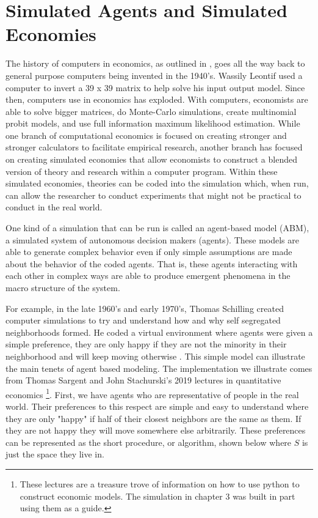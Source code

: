 \documentclass[12pt,twoside]{reedthesis}
\begin{document}
\section{Simulated Agents and Simulated Economies}
The history of computers in economics, as outlined in \citet{Backhouse2016}, goes all the way back to general purpose computers being invented in the 1940's. Wassily Leontif used a computer to invert a 39 x 39 matrix to help solve his input output model. Since then, computers use in economics has exploded. With computers, economists are able to solve bigger matrices, do Monte-Carlo simulations, create multinomial probit models, and use full information maximum likelihood estimation. While one branch of computational economics is focused on creating stronger and stronger calculators to facilitate empirical research, another branch has focused on creating simulated economies that allow economists to construct a blended version of theory and research within a computer program. Within these simulated economies, theories can be coded into the simulation which, when run, can allow the researcher to conduct experiments that might not be practical to conduct in the real world. 

One kind of a simulation that can be run is called an agent-based model (ABM), a simulated system of autonomous decision makers (agents). These models are able to generate complex behavior even if only simple assumptions are made about the behavior of the coded agents. That is, these agents interacting with each other in complex ways are able to produce emergent phenomena in the macro structure of the system.

For example, in the late 1960's and early 1970's, Thomas Schilling created computer simulations to try and understand how and why self segregated neighborhoods formed. He coded a virtual environment where agents were given a simple preference, they are only happy if they are not the minority in their neighborhood and will keep moving otherwise \citep{Schelling1969}. This simple model can illustrate the main tenets of agent based modeling. The implementation we illustrate comes from Thomas Sargent and John Stachurski's 2019 lectures in quantitative economics \footnote{These lectures are a treasure trove of information on how to use python to construct economic models. The simulation in chapter 3 was built in part using them as a guide.}. First, we have agents who are representative of people in the real world. Their preferences to this respect are simple and easy to understand where they are only "happy" if half of their closest neighbors are the same as them. If they are not happy they will move somewhere else arbitrarily. These preferences can be represented as the short procedure, or algorithm, shown below where $S$ is just the space they live in.
\end{document}
